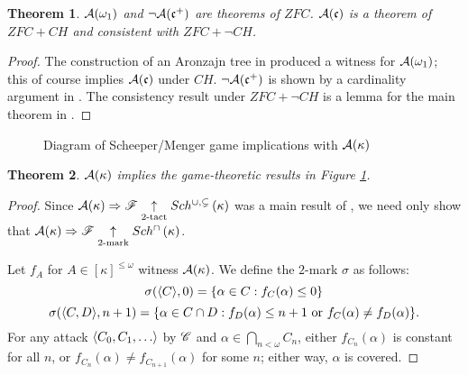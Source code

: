 \documentclass{amsart}
\newtheorem{theorem}{Theorem}[section]
\theoremstyle{definition}
\begin{document}
\begin{theorem}
  \(\mathcal{A}(\omega_1)\) and \(\neg\mathcal{A}(\mathfrak{c}^+)\)
  are theorems of \(ZFC\).
  \(\mathcal{A}(\mathfrak{c})\) is a theorem of \(ZFC+CH\) and consistent with
  \(ZFC+\neg CH\).
\end{theorem}

\begin{proof}
  The construction of an Aronzajn tree in \cite[Theorem 5.9]{MR597342}
  produced a witness for \(\mathcal{A}(\omega_1)\); this of course
  implies \(\mathcal{A}(\mathfrak{c})\) under \(CH\).
  \(\neg\mathcal{A}(\mathfrak{c}^+)\) is shown by a cardinality argument
  in \cite{MR1129143}.
  The consistency result under \(ZFC+\neg CH\)
  is a lemma for the main theorem in \cite{MR1129143}.
\end{proof}

\begin{figure}[ht]
\caption{Diagram of Scheeper/Menger game implications with \(\mathcal{A}(\kappa)\)}
\label{GamesDiagram2}
\end{figure}

\begin{theorem}
  \(\mathcal{A}(\kappa)\) implies the game-theoretic results in
  Figure \ref{GamesDiagram2}.
\end{theorem}

\begin{proof}
  Since \(\mathcal{A}(\kappa)\Rightarrow\mathscr{F} \underset{2\text{-tact}}{\uparrow}Sch^{\cup,\subsetneq}\left({\kappa}\right)\) was
  a main result of \cite{MR1129143}, we need only show that
  \(\mathcal{A}(\kappa)\Rightarrow \mathscr{F} \underset{2\text{-mark}}{\uparrow}Sch^{\cap}\left({\kappa}\right)\).

  Let \(f_A\) for \(A\in[\kappa]^{\leq\omega}\) witness \(\mathcal{A}(\kappa)\). We define
  the \(2\)-mark \(\sigma\) as follows:
    \[
      \sigma(\langle C\rangle,0) = \{\alpha\in C: f_C(\alpha) \leq 0 \}
    \]
    \[
      \sigma(\langle C,D\rangle,n+1)
        =
      \{
        \alpha \in C\cap D
      :
        f_D(\alpha) \leq n+1 \text{ or }
        f_C(\alpha)\not=f_D(\alpha)
      \}
    .\]
  For any attack \(\<C_0,C_1,\dots\>\) by \(\mathscr{C}\) and
  \(\alpha\in\bigcap_{n<\omega}C_n\), either \(f_{C_n}(\alpha)\) is constant for
  all \(n\), or \(f_{C_n}(\alpha)\not=f_{C_{n+1}}(\alpha)\) for some \(n\);
  either way, \(\alpha\) is covered.
\end{proof}
\end{document}
